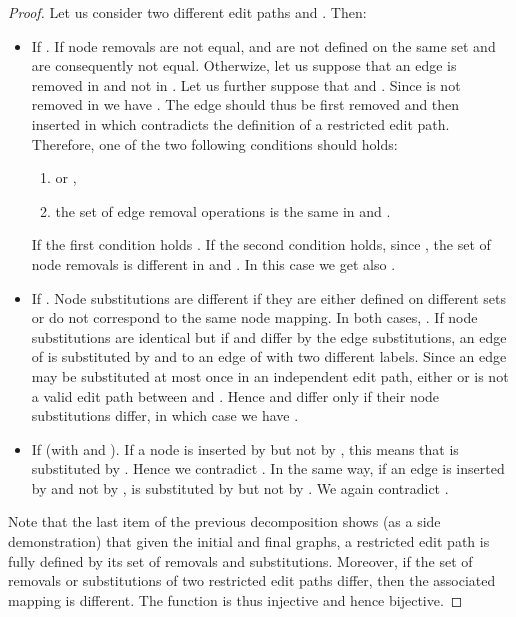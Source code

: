 \begin{proof}
  Let us consider two different edit paths  and . Then:
  \begin{itemize}
  \item If . If node removals are not equal,  and
     are not defined on the same set and are consequently
    not equal. Otherwize, let us suppose that an edge  is
    removed in  and not in . Let us further suppose that
     and . Since
     is not removed in  we have
    . The
    edge  should thus be first removed and then inserted in 
    which contradicts the definition of a restricted edit
    path. Therefore, one of the two following conditions should holds:
    \begin{enumerate}
    \item      or ,
    \item the set of edge removal operations is the same in  and .
    \end{enumerate}
    If the first condition holds . If the second
    condition holds, since , the set of node removals is
    different in  and . In this case we get also
    .
  \item If . Node substitutions are different if they are
    either defined on different sets or do not correspond to the same
    node mapping. In both cases, . If node
    substitutions are identical but if  and  differ by the
    edge substitutions, an edge of  is substituted by  and  to an edge of
     with two different labels. Since an edge may
    be substituted at most once in an independent edit path, either
     or  is not a valid edit path between  and .
    Hence  and  differ only if their node substitutions differ, 
    in which case we have .
  \item If  (with  and ). If a node 
    is inserted by  but not by , this means that  is
    substituted by . Hence we contradict . In the same way,
    if an edge  is inserted by  and not by ,
     is substituted by  but not by . We again contradict
    .   
  \end{itemize}
  Note that the last item of the previous decomposition shows (as a
  side demonstration) that given the initial and final graphs, a
  restricted edit path is fully defined by its set of removals and
  substitutions.  Moreover, if the set of removals or substitutions of
  two restricted edit paths differ, then the associated mapping is
  different. The function  is thus injective and hence
  bijective.
\end{proof}
